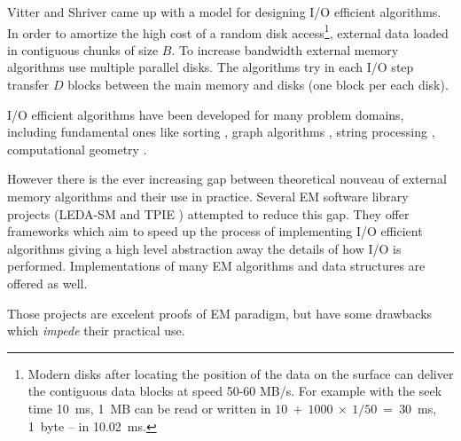 \documentclass[twoside]{book}
\begin{document}
Vitter and Shriver \cite{VitShr94both} came up with a model for designing I/O
efficient algorithms. In order to amortize the high cost of a random
disk access\footnote{Modern disks after locating the position of the
data on the surface can deliver the contiguous data blocks at speed
50-60 MB/s. For example with the seek time 10~ms, 1~MB can be read or
written in $10~+~1000~\times~1/50~=~30$~ms, 1~byte -- in 10.02~ms.},
external data loaded in contiguous chunks of size $B$. To increase
bandwidth external memory algorithms use multiple parallel disks. The
algorithms try in each I/O step transfer $D$ blocks between the main
memory and disks (one block per each disk).


I/O efficient algorithms have been developed for many
problem domains, including fundamental ones like sorting \cite{},
graph algorithms \cite{}, string processing \cite{}, computational
geometry \cite{}. 

However there is the ever increasing gap between theoretical
nouveau of external memory algorithms and their use in practice.   
Several EM software library projects (LEDA-SM \cite{CraMeh99} and TPIE
\cite{APV02}) attempted to 
reduce this gap. They offer frameworks which aim to speed up the
process of implementing I/O efficient algorithms giving a high level
abstraction away the details of how I/O is performed. Implementations
of many EM algorithms and data structures are offered as well.

Those projects are excelent proofs of EM paradigm, but have
some drawbacks which \emph{impede} their practical use.
\end{document}
